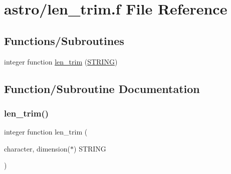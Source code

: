 \hypertarget{astro_2len__trim_8f}{}\section{astro/len\+\_\+trim.f File Reference}
\label{astro_2len__trim_8f}
\subsection*{Functions/\+Subroutines}
\begin{DoxyCompactItemize}
\item 
integer function \hyperlink{astro_2len__trim_8f_a16b24aa64df0a5da0c57510698b7ba8e}{len\+\_\+trim} (\hyperlink{eval__tab_8h_a0f4d394a3ab4e09bff60f714c66dc5ee}{S\+T\+R\+I\+NG})
\end{DoxyCompactItemize}


\subsection{Function/\+Subroutine Documentation}
\mbox{\label{astro_2len__trim_8f_a16b24aa64df0a5da0c57510698b7ba8e}} 
\subsubsection{\texorpdfstring{len\+\_\+trim()}{len\_trim()}}
{\footnotesize\ttfamily integer function len\+\_\+trim (\begin{DoxyParamCaption}\item[{character, dimension($\ast$)}]{S\+T\+R\+I\+NG }\end{DoxyParamCaption})}

